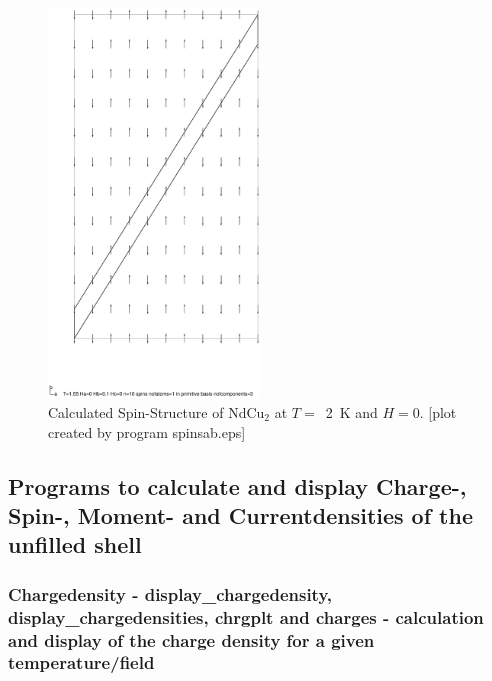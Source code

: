 \begin{figure}[hb]%
\begin{center}\leavevmode
\includegraphics[angle=0, width=0.5\textwidth]{figsrc/ndcu2b/resultss/spinsab.eps}
\end{center}
\caption{Calculated Spin-Structure of NdCu$_2$ at $T=$~2~K and $H=0$.
[plot created by program {\prg spinsab.eps}]}
\label{spingraphic}
\end{figure}

\subsection{Programs to calculate and display Charge-, Spin-, Moment- and Currentdensities
of the unfilled shell}

\subsubsection{Chargedensity - {\prg display\_chargedensity},
{\prg display\_chargedensities},
{\prg chrgplt} and  {\prg charges} - calculation and display of
the charge density for a given temperature/field}
\label{charges}

